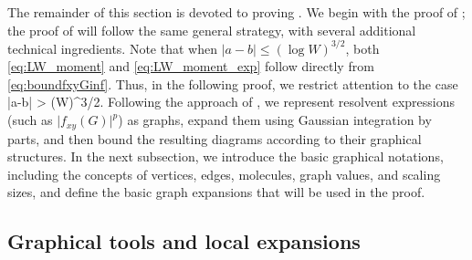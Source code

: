 The remainder of this section is devoted to proving . We begin with the proof of ; the proof of  will follow the same general strategy, with several additional technical ingredients. Note that when $|a-b| \le (\log W)^{3/2}$, both \eqref{eq:LW_moment} and \eqref{eq:LW_moment_exp} follow directly from \eqref{eq:boundfxyGinf}. Thus, in the following proof, we restrict attention to the case
\be\label{eq:far_ab}
|a-b| > (\log W)^{3/2}.
\ee
Following the approach of \cite{yang2021delocalization,yang2022delocalization,yang2021random}, we represent resolvent expressions (such as $\big|f_{xy}(G)\big|^{p}$) as graphs, expand them using Gaussian integration by parts, and then bound the resulting diagrams according to their graphical structures.
In the next subsection, we introduce the basic graphical notations, including the concepts of vertices, edges, molecules, graph values, and scaling sizes, and define the basic graph expansions that will be used in the proof.



\subsection{Graphical tools and local expansions}\label{sec:graphs}


